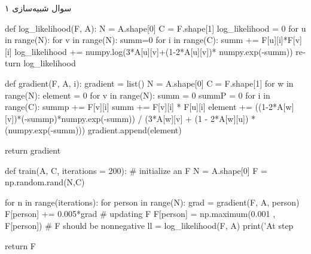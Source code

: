 سوال شبیه‌سازی ۱

\begin{latin}
\begin{python}
def log_likelihood(F, A):
    N = A.shape[0]
    C = F.shape[1]
    log_likelihood = 0
    for u in range(N):
        for v in range(N):
            summ=0
            for i in range(C):
                summ += F[u][i]*F[v][i]
            log_likelihood += numpy.log(3*A[u][v]+(1-2*A[u][v])*
            numpy.exp(-summ))
    return log_likelihood

def gradient(F, A, i):
    gradient = list()
    N = A.shape[0]
    C = F.shape[1]
    for w in range(N):
        element = 0
        for v in range(N):
            summ = 0
            summP = 0
            for i in range(C):
                summp += F[v][i]
                summ += F[v][i] * F[u][i]
            element += ((1-2*A[w][v])*(-summp)*numpy.exp(-summ))  /  (3*A[w][v] + (1 - 2*A[w][u]) * (numpy.exp(-summ)))
        gradient.append(element)
            
    return gradient

def train(A, C, iterations = 200):
 # initialize an F
    N = A.shape[0]
    F = np.random.rand(N,C)

    for n in range(iterations):
        for person in range(N):
            grad = gradient(F, A, person)
            F[person] += 0.005*grad # updating F
            F[person] = np.maximum(0.001 , F[person]) 
            # F should be nonnegative
    ll = log_likelihood(F, A)
    print('At step %

    return F
\end{python}
\end{latin}